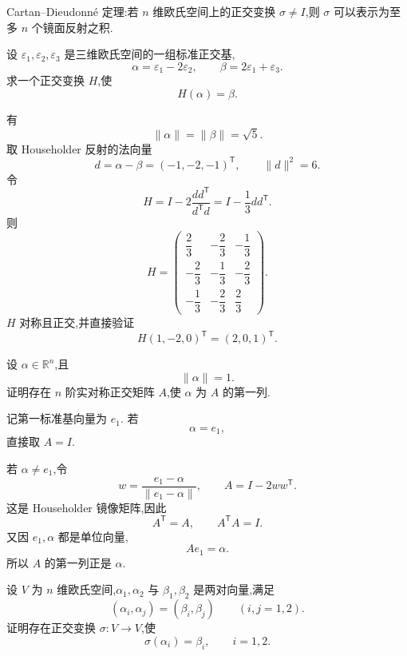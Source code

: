 \begin{theorem}[\markstar]
Cartan--Dieudonné 定理:若 $n$ 维欧氏空间上的正交变换 $\sigma\neq I$,则
$\sigma$ 可以表示为至多 $n$ 个镜面反射之积.
\end{theorem}


\begin{example}
设 $\varepsilon_1,\varepsilon_2,\varepsilon_3$ 是三维欧氏空间的一组标准正交基,
\[
\alpha=\varepsilon_1-2\varepsilon_2,
\qquad
\beta=2\varepsilon_1+\varepsilon_3.
\]
求一个正交变换 $H$,使
\[
H(\alpha)=\beta.
\]
\end{example}
\exampleblank

\begin{solution}
有
\[
\|\alpha\|=\|\beta\|=\sqrt5.
\]
取 Householder 反射的法向量
\[
d=\alpha-\beta=(-1,-2,-1)^{\mathsf T},
\qquad
\|d\|^2=6.
\]
令
\[
H=I-2\dfrac{dd^{\mathsf T}}{d^{\mathsf T}d}
=I-\dfrac13dd^{\mathsf T}.
\]
则
\[
\boxed{
H=
\begin{pmatrix}
\dfrac23&-\dfrac23&-\dfrac13\\[3pt]
-\dfrac23&-\dfrac13&-\dfrac23\\[3pt]
-\dfrac13&-\dfrac23&\dfrac23
\end{pmatrix}.
}
\]
$H$ 对称且正交,并直接验证
\[
H(1,-2,0)^{\mathsf T}=(2,0,1)^{\mathsf T}.
\]
\end{solution}


\begin{example}
设 $\alpha\in\mathbb{R}^n$,且
\[
\|\alpha\|=1.
\]
证明存在 $n$ 阶实对称正交矩阵 $A$,使 $\alpha$ 为 $A$ 的第一列.
\end{example}
\exampleblank

\begin{solution}
记第一标准基向量为 $e_1$.
若
\[
\alpha=e_1,
\]
直接取 $A=I$.

若 $\alpha\neq e_1$,令
\[
w=\dfrac{e_1-\alpha}{\|e_1-\alpha\|},
\qquad
A=I-2ww^{\mathsf T}.
\]
这是 Householder 镜像矩阵,因此
\[
A^{\mathsf T}=A,
\qquad
A^{\mathsf T}A=I.
\]
又因 $e_1,\alpha$ 都是单位向量,
\[
Ae_1=\alpha.
\]
所以 $A$ 的第一列正是 $\alpha$.
\end{solution}


\begin{example}[\markstar]
设 $V$ 为 $n$ 维欧氏空间,$\alpha_1,\alpha_2$ 与 $\beta_1,\beta_2$ 是两对向量,满足
\[
(\alpha_i,\alpha_j)=(\beta_i,\beta_j)
\qquad
(i,j=1,2).
\]
证明存在正交变换 $\sigma:V\to V$,使
\[
\sigma(\alpha_i)=\beta_i,
\qquad i=1,2.
\]
\end{example}
\exampleblank

